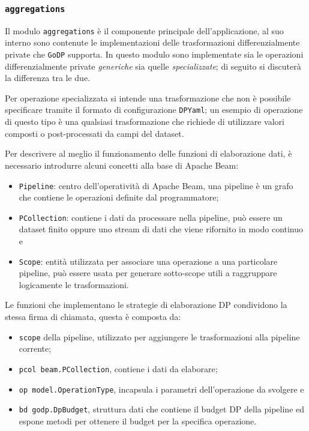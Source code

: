 \subsubsection{\texttt{aggregations}}
Il modulo \texttt{aggregations} è il componente principale dell'applicazione, al suo interno sono contenute le implementazioni delle trasformazioni differenzialmente private che \texttt{GoDP} supporta. In questo modulo sono implementate sia le operazioni differenzialmente private \textit{generiche} sia quelle \textit{specializzate}; di seguito si discuterà la differenza tra le due.

Per operazione specializzata si intende una trasformazione che non è possibile specificare tramite il formato di configurazione \texttt{DPYaml}; un esempio di operazione di questo tipo è una qualsiasi trasformazione che richiede di utilizzare valori composti o post-processati da campi del dataset.

Per descrivere al meglio il funzionamento delle funzioni di elaborazione dati, è necessario introdurre alcuni concetti alla base di Apache Beam:
\begin{itemize}
    \item \texttt{Pipeline}: centro dell'operatività di Apache Beam, una pipeline è un grafo che contiene le operazioni definite dal programmatore;
    \item \texttt{PCollection}: contiene i dati da processare nella pipeline, può essere un dataset finito oppure uno stream di dati che viene rifornito in modo continuo e
    \item \texttt{Scope}: entità utilizzata per associare una operazione a una particolare pipeline, può essere usata per generare sotto-scope utili a raggruppare logicamente le trasformazioni.
\end{itemize}

Le funzioni che implementano le strategie di elaborazione DP condividono la stessa firma di chiamata, questa è composta da:
\begin{itemize}
    \item \texttt{scope} della pipeline, utilizzato per aggiungere le trasformazioni alla pipeline corrente;
    \item \texttt{pcol beam.PCollection}, contiene i dati da elaborare;
    \item \texttt{op model.OperationType}, incapsula i parametri dell'operazione da svolgere e
    \item \texttt{bd godp.DpBudget}, struttura dati che contiene il budget DP della pipeline ed espone metodi per ottenere il budget per la specifica operazione.
\end{itemize}

